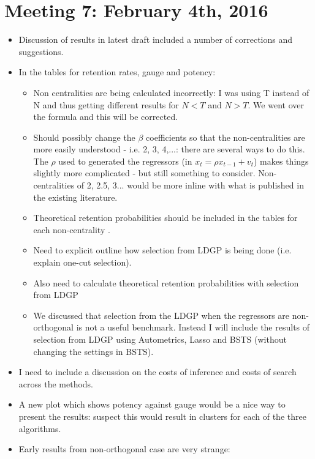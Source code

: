 \documentclass[11pt, oneside]{book}   	%
\begin{document}
\section{Meeting 7: February 4th, 2016}
\begin{itemize}
\item Discussion of results in latest draft included a number of corrections and suggestions.
 
\item In the tables for retention rates, gauge and potency:
\begin{itemize}
\item Non centralities are being calculated incorrectly: I was using T instead of N and thus getting different results for $N<T$ and $N>T$. We went over the formula and this will be corrected.
\item Should possibly change the $\beta$ coefficients so that the non-centralities are more easily understood - i.e. 2, 3, 4,...: there are several ways to do this. The $\rho$ used to generated the regressors (in $x_{t} = \rho x_{t-1} + v_{t}$) makes things slightly more complicated - but still something to consider. Non-centralities of 2, 2.5, 3... would be more inline with what is published in the existing literature.
\item Theoretical retention probabilities should be included in the tables for each non-centrality .
\item Need to explicit outline how selection from LDGP is being done (i.e. explain one-cut selection).
\item Also need to calculate theoretical retention probabilities with selection from LDGP
\item We discussed that selection from the LDGP when the regressors are non-orthogonal is not a useful benchmark. Instead I will include the results of selection from LDGP using Autometrics, Lasso and BSTS (without changing the settings in BSTS).
\end{itemize}
\item I need to include a discussion on the costs of inference and costs of search across the methods.
\item A new plot which shows potency against gauge would be a nice way to present the results: suspect this would result in clusters for each of the three algorithms. 
\item Early results from non-orthogonal case are very strange: 


\end{itemize}
\end{document}
